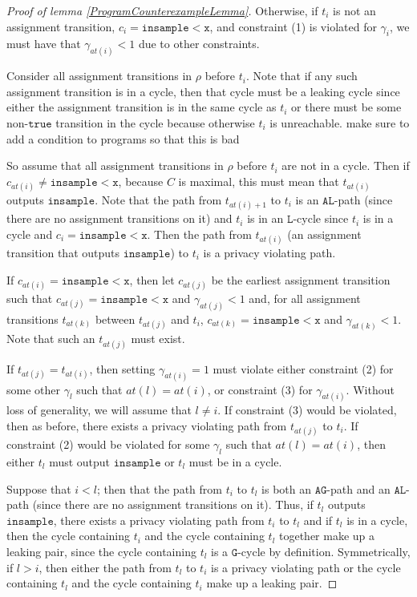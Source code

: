 \documentclass[12pt]{article}
\newcommand{\lguard}[1][x]{\texttt{insample} < #1}
\theoremstyle{definition}
\begin{document}
\begin{proof}[Proof of lemma \ref{ProgramCounterexampleLemma}]
    Otherwise, if $t_i$ is not an assignment transition, $c_i = \lguard[\texttt{x}]$, and constraint (1) is violated for $\gamma_i$, we must have that $\gamma_{at(i)}<1$ due to other constraints.
    
    Consider all assignment transitions in $\rho$ before $t_i$. Note that if any such assignment transition is in a cycle, then that cycle must be a leaking cycle since either the assignment transition is in the same cycle as $t_i$ or there must be some non-$\texttt{true}$ transition in the cycle because otherwise $t_i$ is unreachable. {\color{red} make sure to add a condition to programs so that this is bad}

    So assume that all assignment transitions in $\rho$ before $t_i$ are not in a cycle. Then if $c_{at(i)} \neq \lguard[\texttt{x}]$, because $C$ is maximal, this must mean that $t_{at(i)}$ outputs $\texttt{insample}$. Note that the path from $t_{at(i)+1}$ to $t_i$ is an $\texttt{AL}$-path (since there are no assignment transitions on it) and $t_i$ is in an $\texttt{L}$-cycle since $t_i$ is in a cycle and $c_i = \lguard[\texttt{x}]$. 
    Then the path from $t_{at(i)}$ (an assignment transition that outputs $\texttt{insample}$) to $t_i$ is a privacy violating path. 

    If $c_{at(i)} = \lguard[\texttt{x}]$, then let $c_{at(j)}$ be the earliest assignment transition such that $c_{at(j)} = \lguard[\texttt{x}]$ and $\gamma_{at(j)} < 1$ and, for all assignment transitions $t_{at(k)}$ between $t_{at(j)}$ and $t_i$, $c_{at(k)} = \lguard[\texttt{x}]$ and $\gamma_{at(k)} < 1$. Note that such an $t_{at(j)}$ must exist. 

    If $t_{at(j)} = t_{at(i)}$, then setting $\gamma_{at(i)} =1$ must violate either constraint (2) for some other $\gamma_l$ such that $at(l)=at(i)$, or constraint (3) for $\gamma_{at(i)}$. Without loss of generality, we will assume that $l\neq i$. If constraint (3) would be violated, then as before, there exists a privacy violating path from $t_{at(j)}$ to $t_i$. 
    If constraint (2) would be violated for some $\gamma_l$ such that $at(l)=at(i)$, then either $t_l$ must output $\texttt{insample}$ or $t_l$ must be in a cycle. 
    
    Suppose that $i<l$; then that the path from $t_i$ to $t_l$ is both an $\texttt{AG}$-path and an $\texttt{AL}$-path (since there are no assignment transitions on it). Thus, if $t_l$ outputs $\texttt{insample}$, there exists a privacy violating path from $t_i$ to $t_l$ and if $t_l$ is in a cycle, then the cycle containing $t_i$ and the cycle containing $t_l$ together make up a leaking pair, since the cycle containing $t_l$ is a $\texttt{G}$-cycle by definition. 
    Symmetrically, if $l>i$, then either the path from $t_l$ to $t_i$ is a privacy violating path or the cycle containing $t_l$ and the cycle containing $t_i$ make up a leaking pair.
    

\end{proof}
\end{document}
